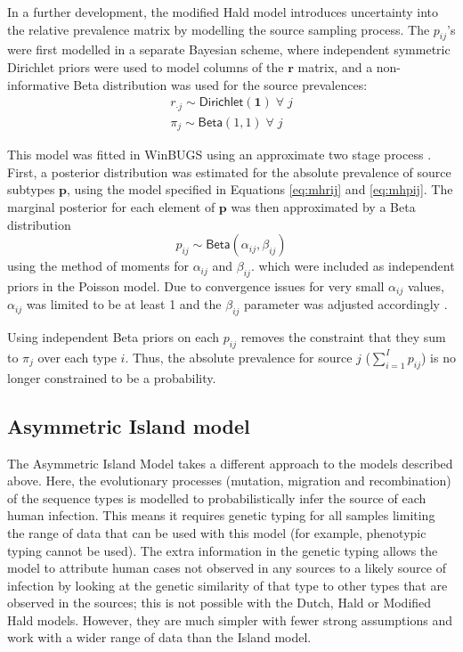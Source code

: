 In a further development, the modified Hald model introduces uncertainty into the relative prevalence matrix by modelling the source sampling process. The $p_{ij}$'s were first modelled in a separate 
Bayesian scheme, where independent symmetric Dirichlet priors were used to model columns of the $\bm{r}$ matrix, and a non-informative Beta distribution was used for the source prevalences:
\begin{eqnarray}
r_{\cdot j}\sim\textsf{Dirichlet}(\bm{1}) \; \forall \; j \label{eq:mhrij} \\
\pi_{j}\sim\textsf{Beta}(1,1) \; \forall \; j \label{eq:mhpij}
\end{eqnarray}

This model was fitted in WinBUGS using an approximate two stage process \citep{MulJonNob09}.  First, a posterior distribution was estimated for the absolute prevalence of source subtypes $\bm{p}
$, using the model specified in Equations \ref{eq:mhrij} and \ref{eq:mhpij}.  The marginal posterior for each element of $\bm{p}$ was then approximated by a Beta distribution
$$
p_{ij}\sim\textsf{Beta}(\alpha_{ij},\beta_{ij})
$$
using the method of moments for $\alpha_{ij}$ and $\beta_{ij}$.  which were included as independent priors in the Poisson model.  Due to convergence issues for very small $\alpha_{ij}$ values, $
\alpha_{ij}$ was limited to be at least 1 and the $\beta_{ij}$ parameter was adjusted accordingly \citep{FreMar09}.

Using independent Beta priors on each $p_{ij}$ removes the constraint that they sum to $\pi_{j}$ over each type $i$.  Thus, the absolute prevalence for source $j$ ($\sum_{i=1}^{I}p_{ij}$) is no longer 
constrained to be a probability. 



\subsection{Asymmetric Island model}

The Asymmetric Island Model \citep{WilGabLea08, iSource} takes a different approach to the models described above.  Here,  the evolutionary processes (mutation, migration and recombination) of the 
sequence types is modelled to probabilistically infer the source of each human infection. This means it requires genetic typing for all samples limiting the range of data that can be used with this 
model (for example, phenotypic typing cannot be used). The extra information in the genetic typing allows the model to attribute human cases not observed in any sources to a likely source of 
infection by looking at the genetic similarity of that type to other types that are observed in the sources; this is not possible with the Dutch, Hald or Modified Hald models. However, they are much 
simpler with fewer strong assumptions and work with a wider range of data than the Island model. 